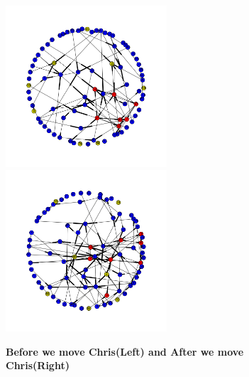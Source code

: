 \documentclass[12pt]{article}
\begin{document}
\begin{figure}[!htb]
\centering
\includegraphics[width=6cm]{fig7_11_13_1.png}
\includegraphics[width=6cm]{fig7_11_13_2.png}
\caption{\textbf{Before we move Chris(Left) and After we move Chris(Right)}}
\label{F2}
\end{figure}
\end{document}
